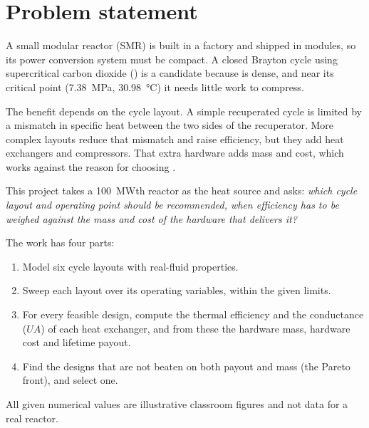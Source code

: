 \section{Problem statement}

A small modular reactor (SMR) is built in a factory and shipped in modules, so its power conversion system must be compact. A closed Brayton cycle using supercritical carbon dioxide (\scotwo) is a candidate because \cotwo{} is dense, and near its critical point (\SI{7.38}{MPa}, \SI{30.98}{\celsius}) it needs little work to compress.

The benefit depends on the cycle layout. A simple recuperated cycle is limited by a mismatch in specific heat between the two sides of the recuperator. More complex layouts reduce that mismatch and raise efficiency, but they add heat exchangers and compressors. That extra hardware adds mass and cost, which works against the reason for choosing \scotwo.

This project takes a \SI{100}{MWth} reactor as the heat source and asks: \emph{which cycle layout and operating point should be recommended, when efficiency has to be weighed against the mass and cost of the hardware that delivers it?}

The work has four parts:
\begin{enumerate}
  \item Model six cycle layouts with real-fluid properties.
  \item Sweep each layout over its operating variables, within the given limits.
  \item For every feasible design, compute the thermal efficiency and the conductance ($UA$) of each heat exchanger, and from these the hardware mass, hardware cost and lifetime payout.
  \item Find the designs that are not beaten on both payout and mass (the Pareto front), and select one.
\end{enumerate}

All given numerical values are illustrative classroom figures and not data for a real reactor.
